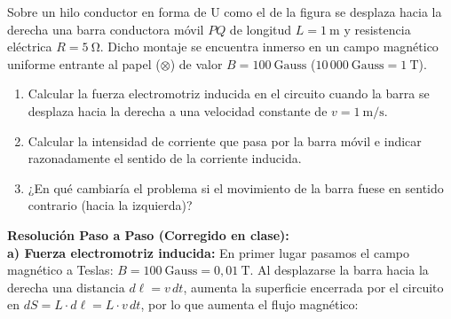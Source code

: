 \begin{ejercicio}
Sobre un hilo conductor en forma de U como el de la figura se desplaza hacia la derecha una barra conductora móvil $PQ$ de longitud $L = 1\ \si{\meter}$ y resistencia eléctrica $R = 5\ \si{\ohm}$. Dicho montaje se encuentra inmerso en un campo magnético uniforme entrante al papel ($\otimes$) de valor $B = 100\ \text{Gauss}$ ($10\,000\ \text{Gauss} = 1\ \si{\tesla}$).
\begin{enumerate}[label=\alph*)]
    \item Calcular la fuerza electromotriz inducida en el circuito cuando la barra se desplaza hacia la derecha a una velocidad constante de $v = 1\ \si{\meter\per\second}$.
    \item Calcular la intensidad de corriente que pasa por la barra móvil e indicar razonadamente el sentido de la corriente inducida.
    \item ¿En qué cambiaría el problema si el movimiento de la barra fuese en sentido contrario (hacia la izquierda)?
\end{enumerate}
\tcbline
\begin{center}
\end{center}
\textbf{Resolución Paso a Paso (Corregido en clase):}\\[4pt]
\textbf{a) Fuerza electromotriz inducida:}
En primer lugar pasamos el campo magnético a Teslas: $B = 100\ \text{Gauss} = 0{,}01\ \si{\tesla}$. Al desplazarse la barra hacia la derecha una distancia $d\ell = v\, dt$, aumenta la superficie encerrada por el circuito en $dS = L \cdot d\ell = L \cdot v\, dt$, por lo que aumenta el flujo magnético:

\end{ejercicio}
